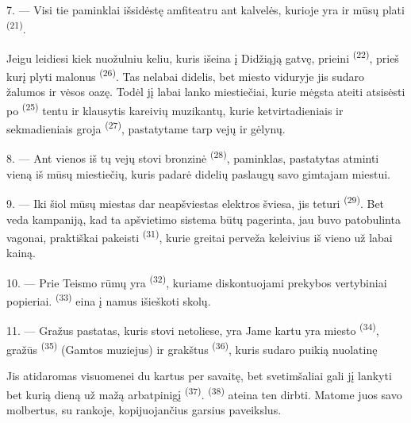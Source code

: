 7. --- Visi tie paminklai išsidėstę amfiteatru ant kalvelės, kurioje yra ir mūsų
plati  \textsuperscript{(21)}.

Jeigu leidiesi kiek nuožulniu keliu, kuris išeina į Didžiąją gatvę, prieini
 \textsuperscript{(22)}, prieš kurį plyti malonus 
\textsuperscript{(26)}. Tas  nelabai didelis, bet miesto viduryje jis
sudaro žalumos ir vėsos oazę. Todėl jį labai lanko miestiečiai, kurie mėgsta ateiti
atsisėsti po  \textsuperscript{(25)} tentu ir klausytis kareivių
muzikantų, kurie ketvirtadieniais ir sekmadieniais groja 
\textsuperscript{(27)}, pastatytame tarp vejų ir gėlynų.

8. --- Ant vienos iš tų vejų stovi bronzinė  \textsuperscript{(28)},
paminklas, pastatytas atminti vieną iš mūsų miestiečių, kuris padarė didelių paslaugų
savo gimtajam miestui.

\VUsaut{4.0mm}
\VUsaut{3.4mm}

9. --- Iki šiol mūsų miestas dar neapšviestas elektros šviesa, jis teturi
 \textsuperscript{(29)}. Bet  veda
kampaniją, kad ta apšvietimo sistema būtų pagerinta,  jau buvo
patobulinta   vagonai,
  praktiškai pakeisti  \textsuperscript{(31)}, kurie greitai perveža keleivius iš vieno
 už labai  kainą.

10. --- Prie Teismo rūmų yra  \textsuperscript{(32)}, kuriame
diskontuojami prekybos vertybiniai popieriai. 
\textsuperscript{(33)} eina į namus išieškoti skolų.

\VUsaut{4.0mm}
\VUsaut{3.4mm}

11. --- Gražus pastatas, kuris stovi netoliese, yra  Jame kartu yra
miesto  \textsuperscript{(34)}, gražūs  \textsuperscript{(35)} (Gamtos muziejus) ir grakštus  \textsuperscript{(36)}, kuris sudaro puikią nuolatinę 

Jis atidaromas visuomenei du kartus per savaitę, bet svetimšaliai gali jį lankyti bet
kurią dieną už mažą arbatpinigį  \textsuperscript{(37)}.
 \textsuperscript{(38)} ateina ten dirbti. Matome juos
 savo molbertus, su  rankoje, kopijuojančius garsius
paveikslus.

